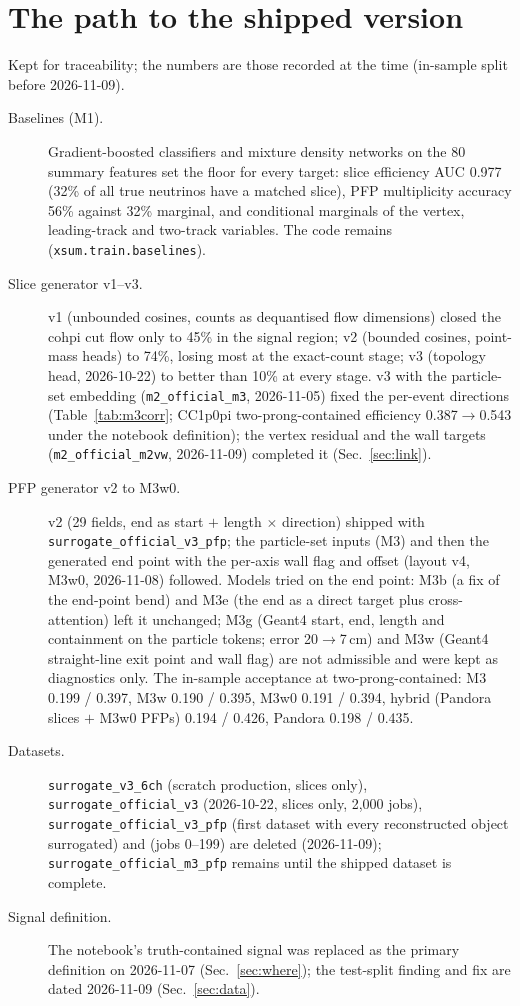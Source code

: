 \documentclass[11pt]{article}
\newcommand{\real}{Pandora}
\begin{document}
\appendix
\section{The path to the shipped version}
\label{sec:history}

Kept for traceability; the numbers are those recorded at the time (in-sample split before 2026-11-09).
\begin{description}
\item[Baselines (M1).] Gradient-boosted classifiers and mixture density networks on the 80 summary features set
      the floor for every target: slice efficiency AUC 0.977 (32\% of all true neutrinos have a matched slice),
      PFP multiplicity accuracy 56\% against 32\% marginal, and conditional marginals of the vertex, leading-track
      and two-track variables. The code remains (\texttt{xsum.train.baselines}).
\item[Slice generator v1--v3.] v1 (unbounded cosines, counts as dequantised flow dimensions) closed the cohpi cut
      flow only to 45\% in the signal region; v2 (bounded cosines, point-mass heads) to 74\%, losing most at the
      exact-count stage; v3 (topology head, 2026-10-22) to better than 10\% at every stage. v3 with the
      particle-set embedding (\texttt{m2\_official\_m3}, 2026-11-05) fixed the per-event directions
      (Table~\ref{tab:m3corr}; CC1p0pi two-prong-contained efficiency 0.387$\to$0.543 under the notebook
      definition); the vertex residual and the wall targets (\texttt{m2\_official\_m2vw}, 2026-11-09) completed
      it (Sec.~\ref{sec:link}).
\item[PFP generator v2 to M3w0.] v2 (29 fields, end as start $+$ length $\times$ direction) shipped with
      \texttt{surrogate\_official\_v3\_pfp}; the particle-set inputs (M3) and then the generated end point with the
      per-axis wall flag and offset (layout v4, M3w0, 2026-11-08) followed. Models tried on the end point: M3b (a
      fix of the end-point bend) and M3e (the end as a direct target plus cross-attention) left it unchanged;
      M3g (Geant4 start, end, length and containment on the particle tokens; error 20$\to$7\,cm) and M3w (Geant4
      straight-line exit point and wall flag) are not admissible and were kept as diagnostics only. The in-sample
      acceptance at two-prong-contained: M3 0.199 / 0.397, M3w 0.190 / 0.395, M3w0 0.191 / 0.394, hybrid
      (\real{} slices $+$ M3w0 PFPs) 0.194 / 0.426, \real{} 0.198 / 0.435.
\item[Datasets.] \texttt{surrogate\_v3\_6ch} (scratch production, slices only), \texttt{surrogate\_official\_v3}
      (2026-10-22, slices only, 2,000 jobs), \texttt{surrogate\_official\_v3\_pfp} (first dataset with every
      reconstructed object surrogated) and  (jobs 0--199) are deleted
      (2026-11-09); \texttt{surrogate\_official\_m3\_pfp} remains until the shipped dataset is complete.
\item[Signal definition.] The notebook's truth-contained signal was replaced as the primary definition on
      2026-11-07 (Sec.~\ref{sec:where}); the test-split finding and fix are dated 2026-11-09 (Sec.~\ref{sec:data}).
\end{description}
\end{document}
